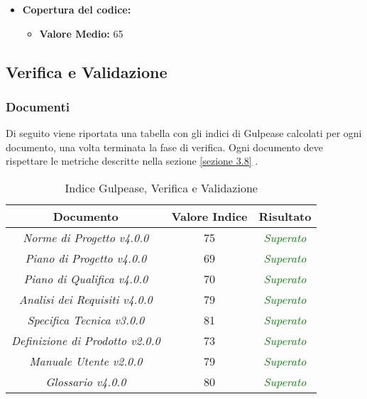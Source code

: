 \begin{itemize}


	\item \textbf{Copertura del codice:}
	\begin{itemize}
		\item \textbf{Valore Medio:} 65%
	\end{itemize}


\end{itemize}

\subsection{Verifica e Validazione}
\subsubsection{Documenti}
\label{appendice 8}

Di seguito viene riportata una tabella con gli indici di Gulpease calcolati per ogni documento, una volta terminata la fase di verifica. Ogni documento deve rispettare le metriche descritte nella sezione \ref{sezione 3.8} .\\

\hspace{1cm}

\begin{table}[h]
	\begin{tabular}{|c|c|c|}
		\hline 
		\textbf{Documento} & \textbf{Valore Indice} & \textbf{Risultato} \\ 
		\hline
		\textit{Norme di Progetto v4.0.0} & 75 & \textcolor{green}{\textit{Superato}} \\  
		\textit{Piano di Progetto v4.0.0} & 69 & \textcolor{green}{\textit{Superato}} \\ 
		\textit{Piano di Qualifica v4.0.0} & 70 & \textcolor{green}{\textit{Superato}} \\ 
		\textit{Analisi dei Requisiti v4.0.0} & 79 & \textcolor{green}{\textit{Superato}} \\
		\textit{Specifica Tecnica v3.0.0} & 81 & \textcolor{green}{\textit{Superato}} \\ 
		\textit{Definizione di Prodotto v2.0.0} & 73 & \textcolor{green}{\textit{Superato}} \\ 
		\textit{Manuale Utente v2.0.0} & 79 & \textcolor{green}{\textit{Superato}} \\ 
		\textit{Glossario v4.0.0} & 80 & \textcolor{green}{\textit{Superato}} \\ 
		\hline 
	\end{tabular}
	\caption{Indice Gulpease, Verifica e Validazione}
\end{table}

